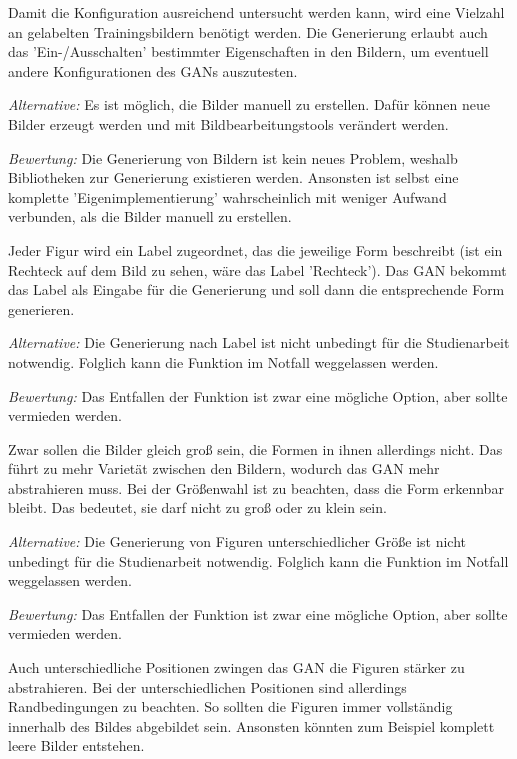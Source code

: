 \begin{description}[style=nextline]
	\item[Generierung von synthetischen Trainingsbildern]
	Damit die Konfiguration ausreichend untersucht werden kann, wird eine Vielzahl an gelabelten Trainingsbildern benötigt werden.
	Die Generierung erlaubt auch das 'Ein-/Ausschalten' bestimmter Eigenschaften in den Bildern, um eventuell andere Konfigurationen des GANs auszutesten.
	
	\textit{Alternative:}
	Es ist möglich, die Bilder manuell zu erstellen.
	Dafür können neue Bilder erzeugt werden und mit Bildbearbeitungstools verändert werden.
	
	\textit{Bewertung:}
	Die Generierung von Bildern ist kein neues Problem, weshalb Bibliotheken zur Generierung existieren werden.
	Ansonsten ist selbst eine komplette 'Eigenimplementierung' wahrscheinlich mit weniger Aufwand verbunden, als die Bilder manuell zu erstellen.
	
	\item[Generierung von Figuren nach Label]
	Jeder Figur wird ein Label zugeordnet, das die jeweilige Form beschreibt (ist ein Rechteck auf dem Bild zu sehen, wäre das Label 'Rechteck').
	Das GAN bekommt das Label als Eingabe für die Generierung und soll dann die entsprechende Form generieren.
	
	\textit{Alternative:}
	Die Generierung nach Label ist nicht unbedingt für die Studienarbeit notwendig.
	Folglich kann die Funktion im Notfall weggelassen werden.
	
	\textit{Bewertung:}
	Das Entfallen der Funktion ist zwar eine mögliche Option, aber sollte vermieden werden.
	
	\item[Generierung von Figuren mit unterschiedlicher Größe]
	Zwar sollen die Bilder gleich groß sein, die Formen in ihnen allerdings nicht.
	Das führt zu mehr Varietät zwischen den Bildern, wodurch das GAN mehr abstrahieren muss.
	Bei der Größenwahl ist zu beachten, dass die Form erkennbar bleibt.
	Das bedeutet, sie darf nicht zu groß oder zu klein sein.
	
	\textit{Alternative:}
	Die Generierung von Figuren unterschiedlicher Größe ist nicht unbedingt für die Studienarbeit notwendig.
	Folglich kann die Funktion im Notfall weggelassen werden.
	
	\textit{Bewertung:}
	Das Entfallen der Funktion ist zwar eine mögliche Option, aber sollte vermieden werden.
	
	\item[Generierung von Figuren mit unterschiedlicher Postition]
	Auch unterschiedliche Positionen zwingen das GAN die Figuren stärker zu abstrahieren.
	Bei der unterschiedlichen Positionen sind allerdings Randbedingungen zu beachten.
	So sollten die Figuren immer vollständig innerhalb des Bildes abgebildet sein.
	Ansonsten könnten zum Beispiel komplett leere Bilder entstehen.
	

\end{description}
